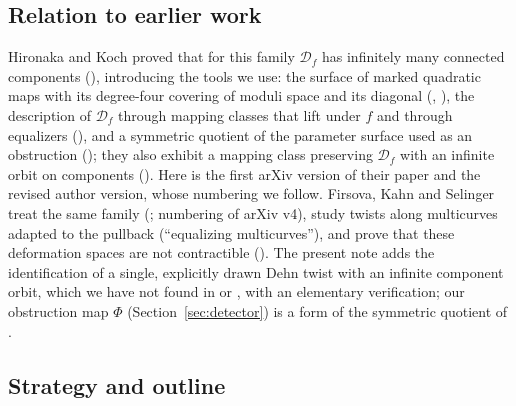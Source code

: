 \documentclass[11pt]{article}
\newcommand{\D}{\mathcal D}
\theoremstyle{remark}
\numberwithin{equation}{section}
\begin{document}
\subsection{Relation to earlier work}\label{sec:prior}

Hironaka and Koch \cite{HK} proved that for this family $\D_f$ has
infinitely many connected components (\cite[Thm.\ 1.4]{HK}), introducing
the tools we use: the surface of marked quadratic maps with its
degree-four covering of moduli space and its diagonal
(\cite[\S\S4.1--4.2]{HKa}, \cite[\S3]{HK}), the description of $\D_f$
through mapping classes that lift under $f$ and through equalizers
(\cite[\S\S2.8--2.11]{HK}), and a symmetric quotient of the parameter
surface used as an obstruction  (\cite[\S2.12]{HK}); they also exhibit a
mapping class preserving $\D_f$ with an infinite orbit on components
(\cite[Prop.\ 3.2]{HK}). Here \cite{HKa} is the first arXiv version of
their paper and \cite{HK} the revised author version, whose numbering we
follow. Firsova, Kahn and Selinger \cite{FKS} treat the same family
(\cite[\S6]{FKS}; numbering of arXiv v4), study twists along multicurves
adapted to the pullback (``equalizing multicurves''), and prove that these
deformation spaces are not contractible (\cite[Lemma 8.4]{FKS}). The
present note adds the identification of a single, explicitly drawn Dehn
twist with an infinite component orbit, which we have not found in
\cite{HK} or \cite{FKS}, with an elementary verification; our obstruction
map $\Phi$ (Section~\ref{sec:detector}) is a form of the symmetric
quotient of \cite{HK}.

\subsection{Strategy and outline}\label{sec:strategy}
\end{document}
